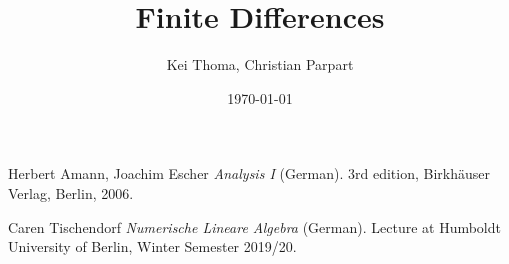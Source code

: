 \documentclass[a4paper,12pt]{scrartcl}
\title{Finite Differences}
\author{Kei Thoma, Christian Parpart}
\date{\today}
\begin{document}
\maketitle
\tableofcontents





\begin{thebibliography}{2}

Herbert Amann, Joachim Escher
\textit{Analysis I} (German). 
3rd edition, Birkh{\"a}user Verlag, Berlin, 2006.

Caren Tischendorf
\textit{Numerische Lineare Algebra} (German).
Lecture at Humboldt University of Berlin, Winter Semester 2019/20.

\end{thebibliography}
\end{document}
